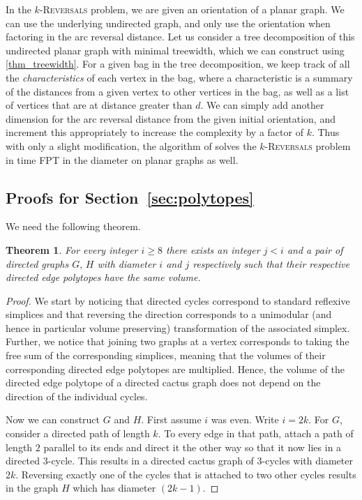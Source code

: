 \documentclass[11pt, twoside]{article}
\numberwithin{equation}{section}
\numberwithin{table}{section}
\numberwithin{figure}{section}
\newtheorem{theorem}{Theorem}[section]
\theoremstyle{definition}
\theoremstyle{definition}
\theoremstyle{definition}
\begin{document}
\begin{appendices}
In the \textsc{$k$-Reversals} problem, we are given an orientation of a planar graph. We can use the underlying undirected graph, and only use the orientation when factoring in the arc reversal distance.
Let us consider a tree decomposition of this undirected planar graph with minimal treewidth, which we can construct using \cref{thm_treewidth}.
For a given bag in the tree decomposition, we keep track of all the \emph{characteristics} of each vertex in the bag, where a characteristic is a summary of the distances from a given vertex to other vertices in the bag, as well as a list of vertices that are at distance greater than $d$. We can simply add another dimension for the arc reversal distance from the given initial orientation, and increment this appropriately to increase the complexity by a factor of $k$. Thus with only a slight modification, the algorithm of \cite{eggemann2009minimizing} solves the \textsc{$k$-Reversals} problem in time FPT in the diameter on planar graphs as well.



\subsection{Proofs for Section~\ref{sec:polytopes}}
\thmEdgePolytope*

We need the following theorem.
\begin{theorem}
    For every integer $i\geq 8$ there exists an integer $j<i$ and a pair of directed graphs $G, \, H$ with diameter $i$ and $j$ respectively such that their respective directed edge polytopes have the same volume.
\end{theorem}

\begin{proof}
    We start by noticing that directed cycles correspond to standard reflexive simplices and that reversing the direction corresponds to a unimodular (and hence in particular volume preserving) transformation of the associated simplex.
    Further, we notice that joining two graphs at a vertex corresponds to taking the free sum of the corresponding simplices, meaning that the volumes of their corresponding directed edge polytopes are multiplied.
    Hence, the volume of the directed edge polytope of a directed cactus graph does not depend on the direction of the individual cycles.

    Now we can construct $G$ and $H$.
    First assume $i$ was even.
    Write $i=2k$.
    For $G$, consider a directed path of length $k$.
    To every edge in that path, attach a path of length $2$ parallel to its ends and direct it the other way so that it now lies in a directed $3$-cycle.
    This results in a directed cactus graph of $3$-cycles with diameter $2k$.
    Reversing exactly one of the cycles that is attached to two other cycles results in the graph $H$ which has diameter $(2k-1)$.


\end{proof}
\end{appendices}
\end{document}

